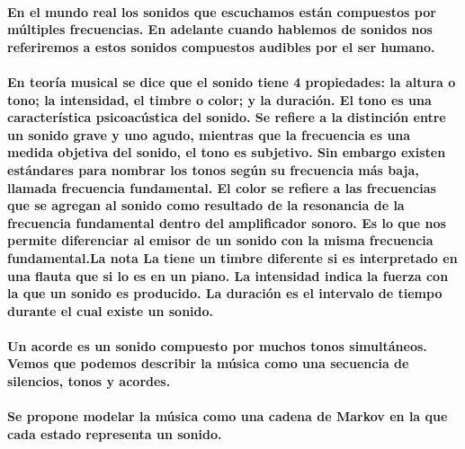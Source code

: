     \paragraph{En el mundo real los sonidos que escuchamos están compuestos por múltiples frecuencias. En adelante cuando hablemos de sonidos nos referiremos a estos sonidos compuestos audibles por el ser humano.}

    \paragraph{En teoría musical se dice que el sonido tiene 4 propiedades: la altura o tono; la intensidad, el timbre o color; y la duración. El tono es una característica psicoacústica del sonido. Se refiere a la distinción entre un sonido grave y uno agudo, mientras que la frecuencia es una medida objetiva del sonido, el tono es subjetivo. Sin embargo existen estándares para nombrar los tonos según su frecuencia más baja, llamada frecuencia fundamental. El color se refiere a las frecuencias que se agregan al sonido como resultado de la resonancia de la frecuencia fundamental dentro del amplificador sonoro.
    Es lo que nos permite diferenciar al emisor de un sonido con la misma frecuencia fundamental.La nota \textbf{La} tiene un timbre diferente si es interpretado en una flauta que si lo es en un piano. La intensidad indica la fuerza con la que un sonido es producido. La duración es el intervalo de tiempo durante el cual existe un sonido.}


    \paragraph{Un acorde es un sonido compuesto por muchos tonos simultáneos. Vemos que podemos describir la música como una secuencia de silencios, tonos y acordes.}

    \paragraph{Se propone modelar la música como una cadena de Markov en la que cada estado representa un sonido.}

